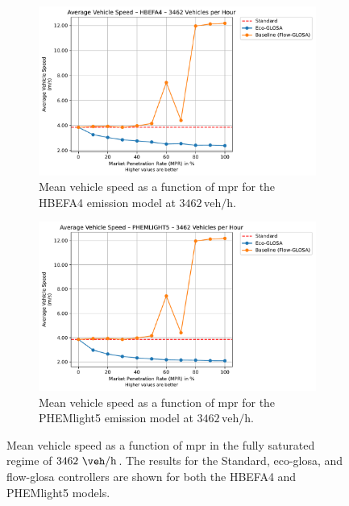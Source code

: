 \begin{figure}[htb]
  \centering
  \begin{subfigure}[b]{0.49\textwidth}
    \includegraphics[width=\textwidth]{data/img/AverageVehicleSpeed/AverageVehicleSpeed_HBEFA4_Cars3462.pdf}
    \caption{Mean vehicle speed as a function of \ac{mpr} for the HBEFA4 emission model at $3462\,\mathrm{veh/h}$.}
    \label{fig:MeanSpeed_HBEFA4_3462}
  \end{subfigure}\hfill
  \begin{subfigure}[b]{0.49\textwidth}
    \includegraphics[width=\textwidth]{data/img/AverageVehicleSpeed/AverageVehicleSpeed_PHEMLIGHT5_Cars3462.pdf}
    \caption{Mean vehicle speed as a function of \ac{mpr} for the PHEMlight5 emission model at $3462\,\mathrm{veh/h}$.}
    \label{fig:MeanSpeed_PHEM_3462}
  \end{subfigure}
  \caption[Mean vehicle speed vs. \ac{mpr} at $3462~\unit{\veh\per\hour}$]{Mean vehicle speed as a function of \ac{mpr} in the fully saturated regime of $3462~\unit{\veh\per\hour}$. The results for the Standard, \ac{eco-glosa}, and \ac{flow-glosa} controllers are shown for both the HBEFA4 and PHEMlight5 models.}
\label{fig:MeanSpeed_3462}
\end{figure}

